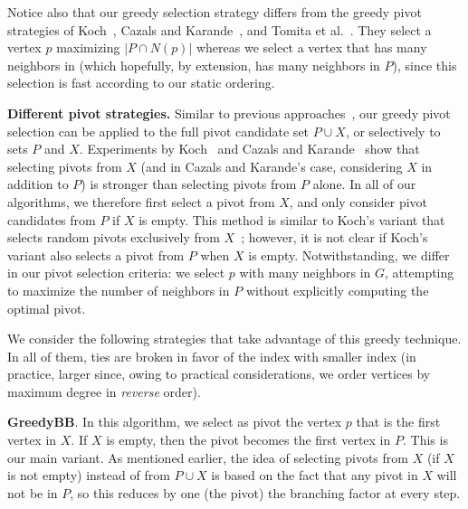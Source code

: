 \documentclass[final,1p]{elsarticle-modified}
\renewcommand{\paragraph}[1]{\medskip\noindent\textbf{#1.}}
\newcommand{\alg}[1]{\textbf{#1}}
\begin{document}
Notice also that our greedy selection strategy differs from the greedy pivot strategies of Koch~\cite{koch2001}, Cazals and Karande~\cite{cazals-karande-2006}, and Tomita et al.~\cite{tomita-2006}. They select a vertex $p$ maximizing $|P\cap N(p)|$ whereas we select a vertex that has many neighbors in  (which hopefully, by extension, has many neighbors in $P$), since this selection is fast according to our static ordering.


\paragraph{Different pivot strategies}
Similar to previous approaches~\cite{tomita-2006,cazals-karande-2006,koch2001,johnston75}, our greedy pivot selection can be applied to the full pivot candidate set $P\cup X$, or selectively to sets $P$ and $X$. Experiments by Koch~\cite{koch2001} and Cazals and Karande~\cite{cazals-karande-2006} show that selecting pivots from $X$ (and in Cazals and Karande's case, considering $X$ in addition to $P$) is stronger than selecting pivots from $P$ alone. In all of our algorithms, we therefore first select a pivot from $X$, and only consider pivot candidates from $P$ if $X$ is empty. This method is similar to Koch's variant that selects random pivots exclusively from $X$~\cite{koch2001}; however, it is not clear if Koch's variant also selects a pivot from $P$ when $X$ is empty. Notwithstanding, we differ in our pivot selection criteria: we select $p$ with many neighbors in $G$, attempting to maximize the number of neighbors in $P$ without explicitly computing the optimal pivot.

We consider the following strategies that take advantage of this greedy technique. In all of them, ties are broken in favor of the index with smaller index (in practice, larger since, owing to practical considerations, we order vertices by maximum degree in \emph{reverse} order).


\alg{GreedyBB}. In this algorithm, we select as pivot the vertex $p$ that is the first vertex in $X$. If $X$ is empty, then the pivot becomes the first vertex in $P$. This is our main variant. As mentioned earlier, the idea of selecting pivots from $X$ (if $X$ is not empty) instead of from $P\cup X$ is based on the fact that any pivot in $X$ will not be in $P$, so this reduces by one (the pivot) the branching factor at every step. 

\end{document}
